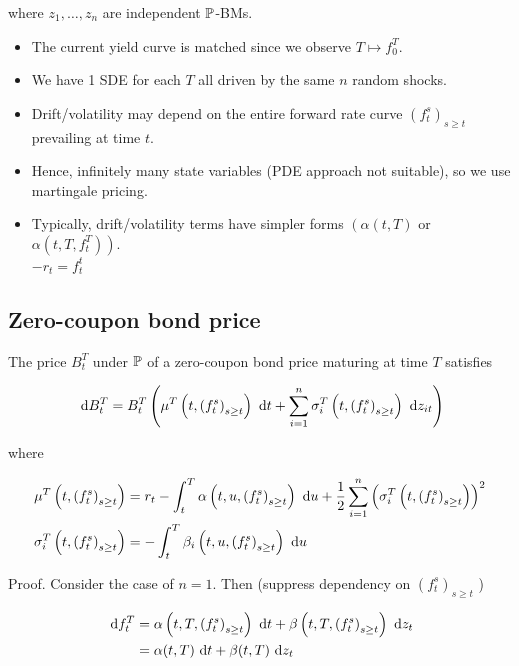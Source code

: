 where $z_{1}, \ldots, z_{n}$ are independent $\P$-BMs.

\begin{itemize}
  \item The current yield curve is matched since we observe $T \mapsto f_{0}^{T}$.
  \item We have 1 SDE for each $T$ all driven by the same $n$ random shocks.
  \item Drift/volatility may depend on the entire forward rate curve $\left(f_{t}^{s}\right)_{s \geq t}$ prevailing at time $t$.
  \item Hence, infinitely many state variables (PDE approach not suitable), so we use martingale pricing.
  \item Typically, drift/volatility terms have simpler forms $\left(\alpha(t, T)\right.$ or $\left.\alpha\left(t, T, f_{t}^{T}\right)\right)$.\\
$-r_{t}=f_{t}^{t}$ 
\end{itemize}

\subsection{Zero-coupon bond price}
The price $B_{t}^{T}$ under $\P$ of a zero-coupon bond price maturing at time $T$ satisfies

$$
\d  B_{t}^{T}=B_{t}^{T}\left(\mu^{T}\left(t,\left(f_{t}^{s}\right)_{s \geq t}\right) \d  t+\sum_{i=1}^{n} \sigma_{i}^{T}\left(t,\left(f_{t}^{s}\right)_{s \geq t}\right) \d  z_{i t}\right)
$$

where

$$
\begin{aligned}
\mu^{T}\left(t,\left(f_{t}^{s}\right)_{s \geq t}\right) & =r_{t}-\int_{t}^{T} \alpha\left(t, u,\left(f_{t}^{s}\right)_{s \geq t}\right) \d  u+\frac{1}{2} \sum_{i=1}^{n}\left(\sigma_{i}^{T}\left(t,\left(f_{t}^{s}\right)_{s \geq t}\right)\right)^{2} \\
\sigma_{i}^{T}\left(t,\left(f_{t}^{s}\right)_{s \geq t}\right) & =-\int_{t}^{T} \beta_{i}\left(t, u,\left(f_{t}^{s}\right)_{s \geq t}\right) \d  u
\end{aligned}
$$

Proof. Consider the case of $n=1$. Then (suppress dependency on $\left(f_{t}^{s}\right)_{s \geq t}$ )

$$
\begin{aligned}
\d  f_{t}^{T} & =\alpha\left(t, T,\left(f_{t}^{s}\right)_{s \geq t}\right) \d  t+\beta\left(t, T,\left(f_{t}^{s}\right)_{s \geq t}\right) \d  z_{t} \\
& =\alpha(t, T) \d  t+\beta(t, T) \d  z_{t}
\end{aligned}
$$

